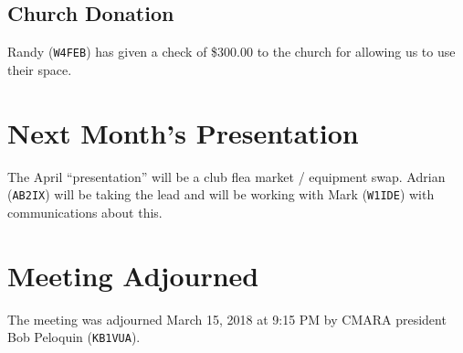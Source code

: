 \documentclass[10pt,letterpaper]{article}
\begin{document}
\subsection{Church Donation}
Randy (\texttt{W4FEB}) has given a check of \$300.00 to the church for allowing us to use their space.

\section{Next Month's Presentation}
The April ``presentation'' will be a club flea market / equipment swap. Adrian (\texttt{AB2IX}) will be taking the lead and will be working with Mark (\texttt{W1IDE}) with communications about this.

\section{Meeting Adjourned}
The meeting was adjourned March 15, 2018 at 9:15 PM by CMARA president Bob Peloquin (\texttt{KB1VUA}).
\end{document}
